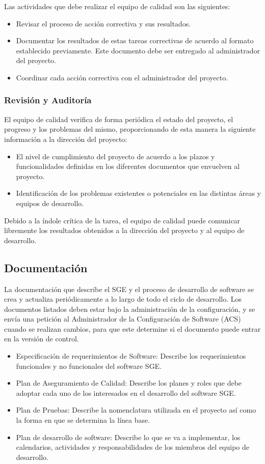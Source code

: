 \documentclass[a4paper,10pt]{article}
\begin{document}
	Las actividades que debe realizar el equipo de calidad son las siguientes:
	\begin{itemize}
		\item Revisar el proceso de acción correctiva y sus resultados.
		\item Documentar los resultados de estas tareas correctivas de acuerdo al formato establecido previamente. Este documento debe ser entregado al administrador del proyecto.
		\item Coordinar cada acción correctiva con el administrador del proyecto.
	\end{itemize}
	
	\subsubsection{Revisión y Auditoría}
	El equipo de calidad verifica de forma periódica el estado del proyecto, el progreso y los problemas del mismo, proporcionando de esta manera la siguiente información a la dirección del proyecto:
	\begin{itemize}
		\item El nivel de cumplimiento del proyecto de acuerdo a los plazos y funcionalidades definidas en los diferentes documentos que envuelven al proyecto.
		\item Identificación de los problemas existentes o potenciales en las distintas áreas y equipos de desarrollo.
	\end{itemize}
	
	Debido a la índole crítica de la tarea, el equipo de calidad puede comunicar libremente los resultados obtenidos a la dirección del proyecto y al equipo de desarrollo.
	
	\subsection{Documentación}
	La documentación que describe el SGE y el proceso de desarrollo de software se crea y actualiza periódicamente a lo largo de todo el ciclo de desarrollo. Los documentos listados deben estar bajo la administración de la configuración, y se envía una petición al Administrador de la Configuración de Software (ACS) cuando se realizan cambios, para que este determine si el documento puede entrar en la versión de control.
	
	\begin{itemize}
		\item Especificación de requerimientos de Software: Describe los requerimientos funcionales y no funcionales del software SGE.
		\item Plan de Aseguramiento de Calidad: Describe los planes y roles que debe adoptar cada uno de los interesados en el desarrollo del software SGE.
		\item Plan de Pruebas: Describe la nomenclatura utilizada en el proyecto así como la forma en que se determina la línea base.
		\item Plan de desarrollo de software: Describe lo que se va a implementar, los calendarios, actividades y responsabilidades de los miembros del equipo de desarrollo.
	\end{itemize}
	
\end{document}

